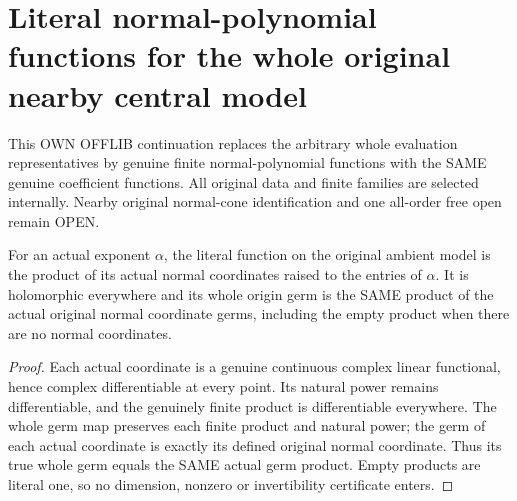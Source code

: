 \section{Literal normal-polynomial functions for the whole original nearby central model}
This OWN OFFLIB continuation replaces the arbitrary whole evaluation representatives by genuine finite normal-polynomial functions with the SAME genuine coefficient functions. All original data and finite families are selected internally. Nearby original normal-cone identification and one all-order free open remain OPEN.

\begin{lemma}
\label{hir:relative-normal-central-literal-monomial-functions}
\leanok
For an actual exponent $\alpha$, the literal function on the original ambient model is the product of its actual normal coordinates raised to the entries of $\alpha$. It is holomorphic everywhere and its whole origin germ is the SAME product of the actual original normal coordinate germs, including the empty product when there are no normal coordinates.
\end{lemma}
\begin{proof}
Each actual coordinate is a genuine continuous complex linear functional, hence complex differentiable at every point. Its natural power remains differentiable, and the genuinely finite product is differentiable everywhere. The whole germ map preserves each finite product and natural power; the germ of each actual coordinate is exactly its defined original normal coordinate. Thus its true whole germ equals the SAME actual germ product. Empty products are literal one, so no dimension, nonzero or invertibility certificate enters.
\end{proof}


